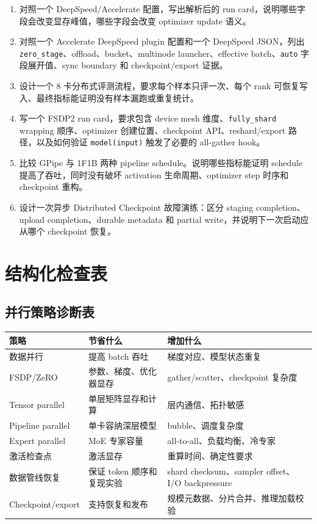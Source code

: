 \documentclass[UTF8,zihao=-4,openany]{ctexbook}
\begin{document}
\begin{enumerate}
\item 对照一个 DeepSpeed/Accelerate 配置，写出解析后的 run card，说明哪些字段会改变显存峰值，哪些字段会改变 optimizer update 语义。
\item 对照一个 Accelerate DeepSpeed plugin 配置和一个 DeepSpeed JSON，列出 \texttt{zero\_stage}、offload、bucket、multinode launcher、effective batch、\texttt{auto} 字段展开值、sync boundary 和 checkpoint/export 证据。
\item 设计一个 8 卡分布式评测流程，要求每个样本只评一次、每个 rank 可恢复写入、最终指标能证明没有样本漏跑或重复统计。
\item 写一个 FSDP2 run card，要求包含 device mesh 维度、\texttt{fully\_shard} wrapping 顺序、optimizer 创建位置、checkpoint API、reshard/export 路径，以及如何验证 \texttt{model(input)} 触发了必要的 all-gather hook。
\item 比较 GPipe 与 1F1B 两种 pipeline schedule。说明哪些指标能证明 schedule 提高了吞吐，同时没有破坏 activation 生命周期、optimizer step 时序和 checkpoint 重构。
\item 设计一次异步 Distributed Checkpoint 故障演练：区分 staging completion、upload completion、durable metadata 和 partial write，并说明下一次启动应从哪个 checkpoint 恢复。
\end{enumerate}

\section{结构化检查表}
\subsection{并行策略诊断表}
\begin{center}
\begin{tabular}{p{}p{}p{}}
\toprule
策略 & 节省什么 & 增加什么 \\
\midrule
数据并行 & 提高 batch 吞吐 & 梯度对应、模型状态重复 \\
FSDP/ZeRO & 参数、梯度、优化器显存 & gather/scatter、checkpoint 复杂度 \\
Tensor parallel & 单层矩阵显存和计算 & 层内通信、拓扑敏感 \\
Pipeline parallel & 单卡容纳深层模型 & bubble、调度复杂度 \\
Expert parallel & MoE 专家容量 & all-to-all、负载均衡、冷专家 \\
激活检查点 & 激活显存 & 重算时间、确定性要求 \\
数据管线恢复 & 保证 token 顺序和复现实验 & shard checksum、sampler offset、I/O backpressure \\
Checkpoint/export & 支持恢复和发布 & 规模元数据、分片合并、推理加载校验 \\
\bottomrule
\end{tabular}
\end{center}
\end{document}
